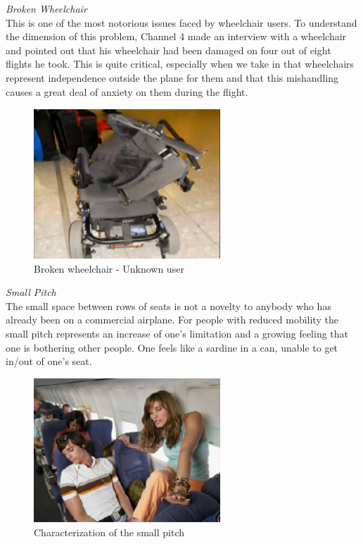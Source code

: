 \emph{Broken Wheelchair}\\ This is one of the most notorious issues faced by wheelchair users. To understand the dimension of this problem, Channel 4 made an interview with a wheelchair and pointed out that his wheelchair had been damaged on four out of eight flights he took. This is quite critical, especially when we take in that wheelchairs represent independence outside the plane for them and that this mishandling causes a great deal of anxiety on them during the flight.  \\
 
\begin{figure}[h]
\centering
\includegraphics[width=7cm]{brazil_images/image001.png}
\caption{Broken wheelchair - Unknown user}
\label{fig:broken_wheelchair}
\end{figure}


\emph{Small Pitch}\\
 The small space between rows of seats is not a novelty to anybody who has already been on a commercial airplane. For people with reduced mobility the small pitch represents an increase of one’s limitation and a growing feeling that one is bothering other people. One feels like a sardine in a can, unable to get in/out of one’s seat.\\

\begin{figure}[h]
\centering
\includegraphics[width=7cm]{brazil_images/image002.png}
\caption{Characterization of the small pitch \cite{aislehumor}}
\label{fig:characterization}
\end{figure}


